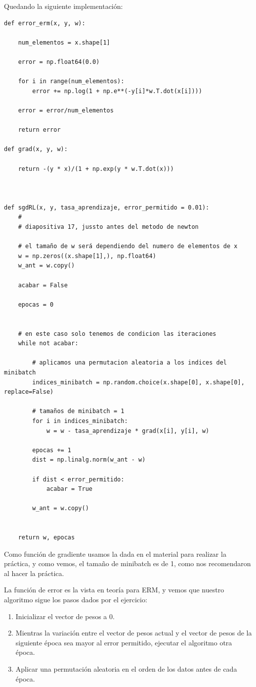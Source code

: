 \documentclass[12pt, spanish]{article}
\begin{document}
Quedando la siguiente implementación:

\begin{lstlisting}
def error_erm(x, y, w):

	num_elementos = x.shape[1]

	error = np.float64(0.0)

	for i in range(num_elementos):
		error += np.log(1 + np.e**(-y[i]*w.T.dot(x[i])))

	error = error/num_elementos

	return error

def grad(x, y, w):

	return -(y * x)/(1 + np.exp(y * w.T.dot(x)))



def sgdRL(x, y, tasa_aprendizaje, error_permitido = 0.01):
    #
	# diapositiva 17, jussto antes del metodo de newton

	# el tamaño de w será dependiendo del numero de elementos de x
	w = np.zeros((x.shape[1],), np.float64)
	w_ant = w.copy()

	acabar = False

	epocas = 0


	# en este caso solo tenemos de condicion las iteraciones
	while not acabar:

		# aplicamos una permutacion aleatoria a los indices del minibatch
		indices_minibatch = np.random.choice(x.shape[0], x.shape[0], replace=False)

		# tamaños de minibatch = 1
		for i in indices_minibatch:
			w = w - tasa_aprendizaje * grad(x[i], y[i], w)

		epocas += 1
		dist = np.linalg.norm(w_ant - w)

		if dist < error_permitido:
			acabar = True

		w_ant = w.copy()


	return w, epocas
\end{lstlisting}

Como función de gradiente usamos la dada en el material para realizar la práctica, y como vemos, el tamaño de minibatch es de 1, como nos recomendaron al hacer la práctica.

La función de error es la vista en teoría para ERM, y vemos que nuestro algoritmo sigue los pasos dados por el ejercicio:

\begin{enumerate}
	\item Inicializar el vector de pesos a 0.
	\item Mientras la variación entre el vector de pesos actual y el vector de pesos de la siguiente época sea mayor al error permitido, ejecutar el algoritmo otra época.
	\item Aplicar una permutación aleatoria en el orden de los datos antes de cada época.
\end{enumerate}
\end{document}

